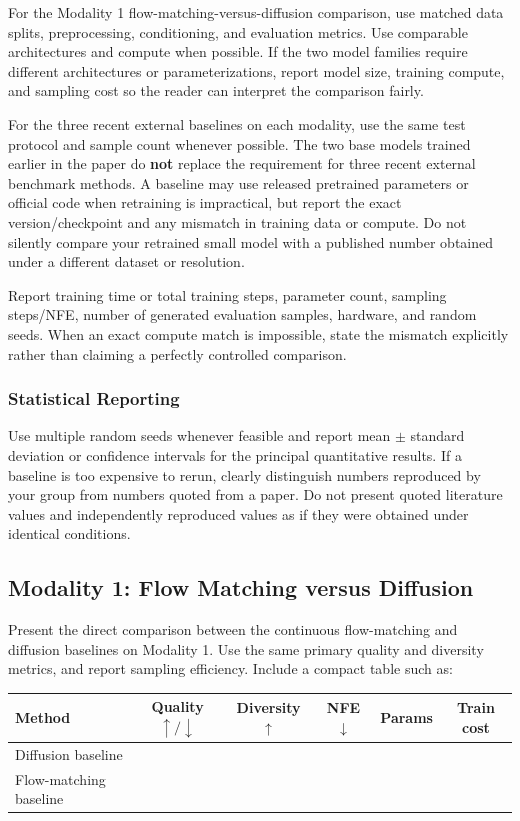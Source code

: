 \documentclass{article}
\begin{document}
For the Modality 1 flow-matching-versus-diffusion comparison, use matched data splits, preprocessing, conditioning, and evaluation metrics. Use comparable architectures and compute when possible. If the two model families require different architectures or parameterizations, report model size, training compute, and sampling cost so the reader can interpret the comparison fairly.

For the three recent external baselines on each modality, use the same test protocol and sample count whenever possible. The two base models trained earlier in the paper do \textbf{not} replace the requirement for three recent external benchmark methods. A baseline may use released pretrained parameters or official code when retraining is impractical, but report the exact version/checkpoint and any mismatch in training data or compute. Do not silently compare your retrained small model with a published number obtained under a different dataset or resolution.

Report training time or total training steps, parameter count, sampling steps/NFE, number of generated evaluation samples, hardware, and random seeds. When an exact compute match is impossible, state the mismatch explicitly rather than claiming a perfectly controlled comparison.

\subsubsection{Statistical Reporting}

Use multiple random seeds whenever feasible and report mean $\pm$ standard deviation or confidence intervals for the principal quantitative results. If a baseline is too expensive to rerun, clearly distinguish numbers reproduced by your group from numbers quoted from a paper. Do not present quoted literature values and independently reproduced values as if they were obtained under identical conditions.


\subsection{Modality 1: Flow Matching versus Diffusion}

Present the direct comparison between the continuous flow-matching and diffusion baselines on Modality 1. Use the same primary quality and diversity metrics, and report sampling efficiency. Include a compact table such as:

\begin{center}
\small
\begin{tabular}{lccccc}
\toprule
Method & Quality $\uparrow/\downarrow$ & Diversity $\uparrow$ & NFE $\downarrow$ & Params & Train cost \\
\midrule
Diffusion baseline & & & & & \\
Flow-matching baseline & & & & & \\
\bottomrule
\end{tabular}
\end{center}
\end{document}
